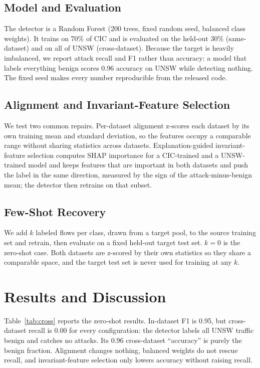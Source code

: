 \documentclass[conference]{IEEEtran}
\begin{document}
\subsection{Model and Evaluation}
The detector is a Random Forest (200 trees, fixed random seed, balanced class weights). It trains on
70\% of CIC and is evaluated on the held-out 30\% (same-dataset) and on all of UNSW (cross-dataset).
Because the target is heavily imbalanced, we report attack recall and F1 rather than accuracy: a
model that labels everything benign scores 0.96 accuracy on UNSW while detecting nothing. The fixed
seed makes every number reproducible from the released code.

\subsection{Alignment and Invariant-Feature Selection}
We test two common repairs. Per-dataset alignment z-scores each dataset by its own training mean and
standard deviation, so the features occupy a comparable range without sharing statistics across
datasets. Explanation-guided invariant-feature selection computes SHAP importance for a CIC-trained
and a UNSW-trained model and keeps features that are important in both datasets and push the label in
the same direction, measured by the sign of the attack-minus-benign mean; the detector then retrains
on that subset.

\subsection{Few-Shot Recovery}
We add $k$ labeled flows per class, drawn from a target pool, to the source training set and retrain,
then evaluate on a fixed held-out target test set. $k=0$ is the zero-shot case. Both datasets are
z-scored by their own statistics so they share a comparable space, and the target test set is never
used for training at any $k$.

\section{Results and Discussion}
Table~\ref{tab:cross} reports the zero-shot results. In-dataset F1 is 0.95, but cross-dataset recall
is 0.00 for every configuration: the detector labels all UNSW traffic benign and catches no attacks.
Its 0.96 cross-dataset ``accuracy'' is purely the benign fraction. Alignment changes nothing,
balanced weights do not rescue recall, and invariant-feature selection only lowers accuracy without
raising recall.
\end{document}
